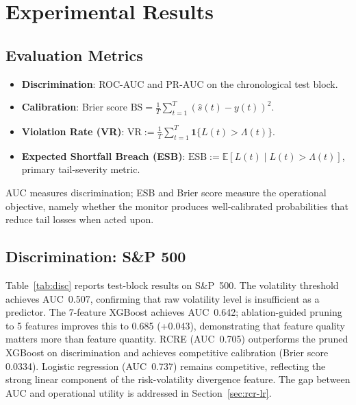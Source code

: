\documentclass[sigconf, anonymous]{acmart}
\begin{document}
\section{Experimental Results}
\label{sec:results}

\subsection{Evaluation Metrics}

\begin{itemize}[leftmargin=*]
\item \textbf{Discrimination}: ROC-AUC and PR-AUC on the chronological test block.
\item \textbf{Calibration}: Brier score $\text{BS} = \frac{1}{T}\sum_{t=1}^T (\hat{s}(t) - y(t))^2$.
\item \textbf{Violation Rate (VR)}: $\text{VR} := \frac{1}{T}\sum_{t=1}^T \mathbf{1}\{L(t) > \Lambda(t)\}$.
\item \textbf{Expected Shortfall Breach (ESB)}: $\text{ESB} := \mathbb{E}[L(t) \mid L(t) > \Lambda(t)]$, primary tail-severity metric.
\end{itemize}
AUC measures discrimination; ESB and Brier score measure the operational objective, namely whether the monitor produces well-calibrated probabilities that reduce tail losses when acted upon.

\subsection{Discrimination: S\&P 500}

Table~\ref{tab:disc} reports test-block results on S\&P~500. The volatility threshold achieves AUC~0.507, confirming that raw volatility level is insufficient as a predictor. The 7-feature XGBoost achieves AUC~0.642; ablation-guided pruning to 5 features improves this to 0.685 (+0.043), demonstrating that feature quality matters more than feature quantity. RCRE (AUC~0.705) outperforms the pruned XGBoost on discrimination and achieves competitive calibration (Brier score 0.0334). Logistic regression (AUC~0.737) remains competitive, reflecting the strong linear component of the risk-volatility divergence feature. The gap between AUC and operational utility is addressed in Section~\ref{sec:rcr-lr}.
\end{document}
